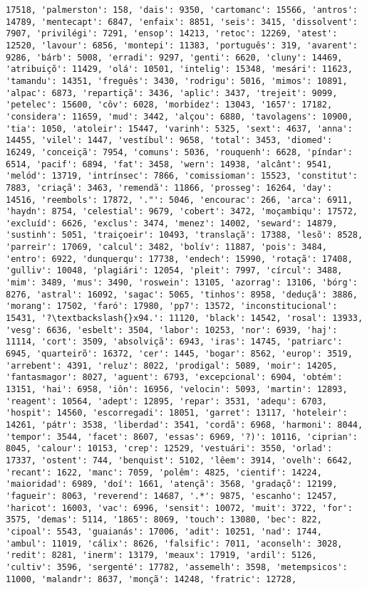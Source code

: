 \documentclass[11pt]{article}
\begin{document}
\begin{Verbatim}[commandchars=\\\{\}]
17518, 'palmerston': 158, 'dais': 9350, 'cartomanc': 15566, 'antros': 14789, 'mentecapt': 6847, 'enfaix': 8851, 'seis': 3415, 'dissolvent': 7907, 'privilégi': 7291, 'ensop': 14213, 'retoc': 12269, 'atest': 12520, 'lavour': 6856, 'montepi': 11383, 'português': 319, 'avarent': 9286, 'bárb': 5008, 'erradi': 9297, 'genti': 6620, 'cluny': 14469, 'atribuiçõ': 11429, 'olá': 10501, 'intelig': 15348, 'mesári': 11623, 'tamandu': 14351, 'freguês': 3430, 'rodrigu': 5016, 'mimos': 10891, 'alpac': 6873, 'repartiçã': 3436, 'aplic': 3437, 'trejeit': 9099, 'petelec': 15600, 'côv': 6028, 'morbidez': 13043, '1657': 17182, 'considera': 11659, 'mud': 3442, 'alçou': 6880, 'tavolagens': 10900, 'tia': 1050, 'atoleir': 15447, 'varinh': 5325, 'sext': 4637, 'anna': 14455, 'vilel': 1447, 'vestíbul': 9658, 'total': 3453, 'diomed': 16249, 'conceiçã': 7954, 'comuns': 5036, 'rouquenh': 6628, 'píndar': 6514, 'pacif': 6894, 'fat': 3458, 'wern': 14938, 'alcânt': 9541, 'melód': 13719, 'intrínsec': 7866, 'comissioman': 15523, 'constitut': 7883, 'criaçã': 3463, 'remendã': 11866, 'prosseg': 16264, 'day': 14516, 'reembols': 17872, '."': 5046, 'encourac': 266, 'arca': 6911, 'haydn': 8754, 'celestial': 9679, 'cobert': 3472, 'moçambiqu': 17572, 'excluíd': 6626, 'exclus': 3474, 'menez': 14002, 'seward': 14879, 'sustinh': 5051, 'traiçoeir': 10493, 'translaçã': 17388, 'lesõ': 8528, 'parreir': 17069, 'calcul': 3482, 'bolív': 11887, 'pois': 3484, 'entro': 6922, 'dunquerqu': 17738, 'endech': 15990, 'rotaçã': 17408, 'gulliv': 10048, 'plagiári': 12054, 'pleit': 7997, 'círcul': 3488, 'mim': 3489, 'mus': 3490, 'roswein': 13105, 'azorrag': 13106, 'bórg': 8276, 'astral': 16092, 'sagac': 5065, 'tinhos': 8958, 'deduçã': 3886, 'morang': 17502, 'faró': 17980, 'pp7': 13572, 'inconstitucional': 15431, '?\textbackslash{}x94.': 11120, 'black': 14542, 'rosal': 13933, 'vesg': 6636, 'esbelt': 3504, 'labor': 10253, 'nor': 6939, 'haj': 11114, 'cort': 3509, 'absolviçã': 6943, 'iras': 14745, 'patriarc': 6945, 'quarteirõ': 16372, 'cer': 1445, 'bogar': 8562, 'europ': 3519, 'arrebent': 4391, 'reluz': 8022, 'prodigal': 5089, 'moir': 14205, 'fantasmagor': 8027, 'aguent': 6793, 'excepcional': 6904, 'obtém': 13151, 'hai': 6958, 'iôn': 16956, 'velocin': 5093, 'martin': 12893, 'reagent': 10564, 'adept': 12895, 'repar': 3531, 'adequ': 6703, 'hospit': 14560, 'escorregadi': 18051, 'garret': 13117, 'hoteleir': 14261, 'pátr': 3538, 'liberdad': 3541, 'cordã': 6968, 'harmoni': 8044, 'tempor': 3544, 'facet': 8607, 'essas': 6969, '?)': 10116, 'ciprian': 8045, 'calour': 10153, 'crep': 12529, 'vestuári': 3550, 'orlad': 17337, 'ostent': 744, 'benquist': 5102, 'lêem': 3914, 'ovelh': 6642, 'recant': 1622, 'manc': 7059, 'polêm': 4825, 'cientif': 14224, 'maioridad': 6989, 'doí': 1661, 'atençã': 3568, 'gradaçõ': 12199, 'fagueir': 8063, 'reverend': 14687, '.*': 9875, 'escanho': 12457, 'haricot': 16003, 'vac': 6996, 'sensit': 10072, 'muit': 3722, 'for': 3575, 'demas': 5114, '1865': 8069, 'touch': 13080, 'bec': 822, 'cipoal': 5543, 'guaianás': 17006, 'adit': 10251, 'nad': 1744, 'ambul': 11019, 'cálix': 8626, 'falsific': 7011, 'aconselh': 3028, 'redit': 8281, 'inerm': 13179, 'meaux': 17919, 'ardil': 5126, 'cultiv': 3596, 'sergenté': 17782, 'assemelh': 3598, 'metempsicos': 11000, 'malandr': 8637, 'monçã': 14248, 'fratric': 12728, 
\end{Verbatim}
\end{document}
